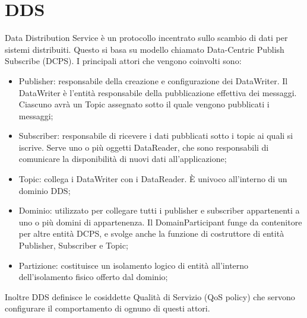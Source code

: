 \section{DDS}
Data Distribution Service è un protocollo incentrato sullo scambio di dati per sistemi distribuiti. Questo si basa su modello chiamato Data-Centric Publish Subscribe (DCPS). I principali attori che vengono coinvolti sono:
\begin{itemize}
    \item Publisher: responsabile della creazione e configurazione dei DataWriter. Il DataWriter è l'entità responsabile della pubblicazione effettiva dei messaggi. Ciascuno avrà un Topic assegnato sotto il quale vengono pubblicati i messaggi;\label{actor:publisher}

    \item Subscriber: responsabile di ricevere i dati pubblicati sotto i topic ai quali si iscrive. Serve uno o più oggetti DataReader, che sono responsabili di comunicare la disponibilità di nuovi dati all'applicazione;\label{actor:subscriber}

    \item Topic: collega i DataWriter con i DataReader. È univoco all'interno di un dominio DDS;\@
    
    \item Dominio: utilizzato per collegare tutti i publisher e subscriber appartenenti a uno o più domini di appartenenza. Il DomainParticipant funge da contenitore per altre entità DCPS, e svolge anche la funzione di costruttore di entità Publisher, Subscriber e Topic;\@

    \item Partizione: costituisce un isolamento logico di entità all'interno dell'isolamento fisico offerto dal dominio;

\end{itemize}
Inoltre DDS definisce le cosiddette Qualità di Servizio (QoS policy) che servono configurare il comportamento di ognuno di questi attori.


